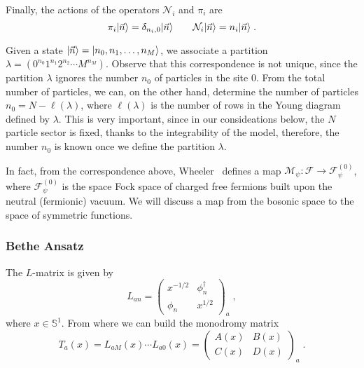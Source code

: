 \documentclass[a4paper,11pt]{amsart}
\begin{document}
Finally, the actions of the operators \(\mathcal{N}_i\) and \(\pi_i\) are
\begin{equation}
    \pi_i\lvert\vec{n}\rangle  = \delta_{n_i, 0} \lvert\vec{n}\rangle \qquad 
    \mathcal{N}_i\lvert\vec{n}\rangle = n_i \lvert\vec{n}\rangle\; .
\end{equation}
 
Given a state \(\lvert\vec{n}\rangle = \lvert n_0, n_1, \dots, n_M\rangle\), we
associate a partition \( \lambda = (0^{n_0} 1^{n_1} 2^{n_2} \cdots
M^{n_M})\). Observe that this correspondence is not unique, since the
partition \(\lambda\) ignores the number \(n_0\) of particles in the
site \(0\). From the total number of particles, we can, on the other hand,
determine the number of particles \(n_0 = N - \ell(\lambda)\), where
\(\ell(\lambda)\) is the number of rows in the Young diagram defined
by \(\lambda\). This is very important, since in our consideations 
below, the \(N\) particle sector is fixed, thanks to the integrability of 
the model, therefore, the number \(n_0\) is known once we define the 
partition \(\lambda\). 

In fact, from the correspondence above, Wheeler~\cite{Wheeler:2010vmq}
defines a map \(\mathcal{M}_\psi: \mathcal{F}\to
\mathcal{F}^{(0)}_\psi\), where \(\mathcal{F}^{(0)}_\psi\) is the
space Fock space of charged free fermions built upon the neutral
(fermionic) vacuum. We will discuss a map from the bosonic space to
the space of symmetric functions.

\subsubsection{Bethe Ansatz}
The \(L\)-matrix is given by 
\begin{equation}
  L_{an} = 
\begin{pmatrix}
x^{ - 1/2} & \phi_n^\dagger \\ \phi_n & x^{1/2}
\end{pmatrix}_a\; , 
\end{equation}
where \(x \in \mathbb{S}^1\). From where we can build the monodromy
matrix
\begin{equation}
  T_a(x) = L_{aM}(x) \cdots L_{a0}(x) = 
\begin{pmatrix}
A(x) & B(x) \\ C(x) & D(x)
\end{pmatrix}_a\; .
\end{equation}
\end{document}
